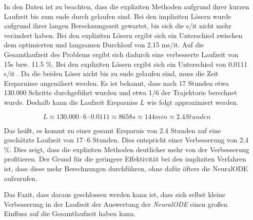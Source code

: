 In den Daten ist zu beachten, dass die expliziten Methoden aufgrund ihrer kurzen Laufzeit bis zum ende durch gelaufen sind.
Bei den impliziten Lösern wurde aufgrund ihrer langen Berechnungszeit gewartet, bis sich die s/it nicht mehr verändert haben.
Bei den expliziten Lösern ergibt sich ein Unterschied zwischen dem optimierten und langsamen Durchlauf von 2.15 ms/it.
Auf die Gesamtlaufzeit des Problems ergibt sich dadurch eine verbesserte Laufzeit von 15s bzw. 11.5 \%.
Bei den expliziten Lösern ergibt sich ein Unterschied von 0.0111 s/it .
Da die beiden Löser nicht bis zu ende gelaufen sind, muss die Zeit Ersparnisse angenähert werden.
Es ist bekannt, dass nach 17 Stunden etwa 130.000 Schritte durchgeführt wurden und etwa 1/6 der Trajektorie berechnet wurde.
Deshalb kann die Laufzeit Ersparniss $L$ wie folgt approximiert werden.

$$
L \approx 130.000 \cdot 6 \cdot 0.0111 \approx 8658s \approx 144 min \approx 2.4 Stunden 
$$

Das heißt, es kommt zu einer gesamt Ersparnis von 2.4 Stunden auf eine geschätzte Laufzeit von $17 \cdot 6 $ Stunden.
Dies entspricht einer Verbesserung von 2,4 \%.
Dies zeigt, dass die expliziten Methoden deutlicher mehr von der Verbesserung profitieren.
Der Grund für die geringere Effektivität bei den impliziten Verfahren ist, dass diese mehr Berechnungen durchführen, ohne dafür öfters 
die NeuralODE aufzurufen.

Das Fazit, dass daraus geschlossen werden kann ist, dass sich selbst kleine Verbesserung in der Laufzeit 
der Auswertung der \textit{NeuralODE} einen großen Einfluss auf die Gesamtlaufzeit haben kann.



